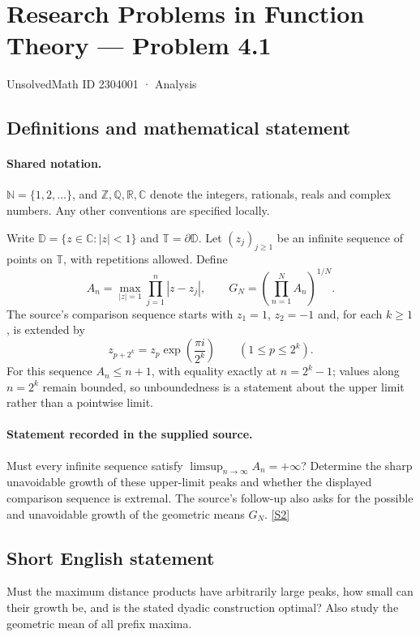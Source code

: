 \documentclass[11pt]{book}
\newcommand{\sref}[2]{\hyperlink{source:#1:#2}{[S#2]}}
\begin{document}
\setcounter{section}{2304000}
\section{Research Problems in Function Theory — Problem 4.1}\label{2304001}
{\small\sffamily UnsolvedMath ID 2304001 · Analysis}
\subsection{Definitions and mathematical statement}

\paragraph{Shared notation.}$\mathbb N=\{1,2,\ldots\}$, and $\mathbb Z,\mathbb Q,\mathbb R,\mathbb C$ denote the integers, rationals, reals and complex numbers. Any other conventions are specified locally.


Write $\mathbb D=\{z\in\mathbb C:|z|<1\}$ and $\mathbb T=\partial\mathbb D$. Let $(z_j)_{j\ge1}$ be an infinite sequence of points on $\mathbb T$, with repetitions allowed. Define
\[A_n=\max_{|z|=1}\prod_{j=1}^n|z-z_j|,\qquad G_N=\left(\prod_{n=1}^NA_n\right)^{1/N}.
\]
The source's comparison sequence starts with $z_1=1$, $z_2=-1$ and, for each $k\ge1$, is extended by
\[z_{p+2^k}=z_p\exp\!\left(\frac{\pi i}{2^k}\right)\qquad(1\le p\le2^k).
\]
For this sequence $A_n\le n+1$, with equality exactly at $n=2^k-1$; values along $n=2^k$ remain bounded, so unboundedness is a statement about the upper limit rather than a pointwise limit.
\paragraph{Statement recorded in the supplied source.}
Must every infinite sequence satisfy $\limsup_{n\to\infty}A_n=+\infty$? Determine the sharp unavoidable growth of these upper-limit peaks and whether the displayed comparison sequence is extremal. The source's follow-up also asks for the possible and unavoidable growth of the geometric means $G_N$. \sref{2304001}{2}
\subsection{Short English statement}
Must the maximum distance products have arbitrarily large peaks, how small can their growth be, and is the stated dyadic construction optimal? Also study the geometric mean of all prefix maxima.
\end{document}
